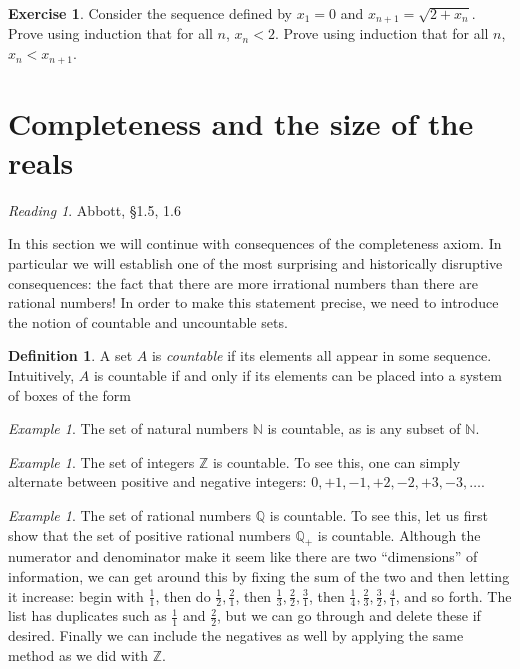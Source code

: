 \documentclass[11pt,oneside]{amsbook}
\newcommand{\N}{\mathbb N}
\newcommand{\Z}{\mathbb Z}
\newcommand{\Q}{\mathbb Q}
\theoremstyle{definition}
\newtheorem{exerc}{Exercise}[section]
\theoremstyle{plain}
\theoremstyle{definition}
\newtheorem{defn}[thm]{Definition}
\theoremstyle{remark}
\newtheorem{example}[thm]{Example}
\newtheorem*{reading}{Reading}
\numberwithin{equation}{section}
\numberwithin{figure}{section}
\begin{document}
\begin{exerc}
  Consider the sequence defined by $x_1=0$ and $x_{n+1}=\sqrt{2+x_n}$.  Prove using induction that for all $n$, $x_n<2$. Prove using induction that for all $n$, $x_n<x_{n+1}$.
\end{exerc}

\newpage
\section{Completeness and the size of the reals}

\begin{reading}
  Abbott, \S 1.5, 1.6
\end{reading}

In this section we will continue with consequences of the completeness axiom. In particular we will establish one of the most surprising and historically disruptive consequences: the fact that there are more irrational numbers than there are rational numbers! In order to make this statement precise, we need to introduce the notion of countable and uncountable sets.

\begin{defn}
  A set $A$ is \emph{countable} if its elements all appear in some sequence. Intuitively, $A$ is countable if and only if its elements can be placed into a system of boxes of the form
\begin{center}
\end{center}
\end{defn}

\begin{example}
  The set of natural numbers $\N$ is countable, as is any subset of $\N$.
\end{example}

\begin{example}
  The set of integers $\Z$ is countable. To see this, one can simply alternate between positive and negative integers: $0,+1,-1,+2,-2,+3,-3,\ldots$.
\end{example}

\begin{example}
  The set of rational numbers $\Q$ is countable. To see this, let us first show that the set of positive rational numbers $\Q_+$ is countable. Although the numerator and denominator make it seem like there are two ``dimensions'' of information, we can get around this by fixing the sum of the two and then letting it increase: begin with $\frac11$, then do $\frac12,\frac21$, then $\frac13,\frac22,\frac31$, then $\frac14,\frac23,\frac32,\frac41$, and so forth. The list has duplicates such as $\frac11$ and $\frac22$, but we can go through and delete these if desired. Finally we can include the negatives as well by applying the same method as we did with $\Z$.
\end{example}
\end{document}
